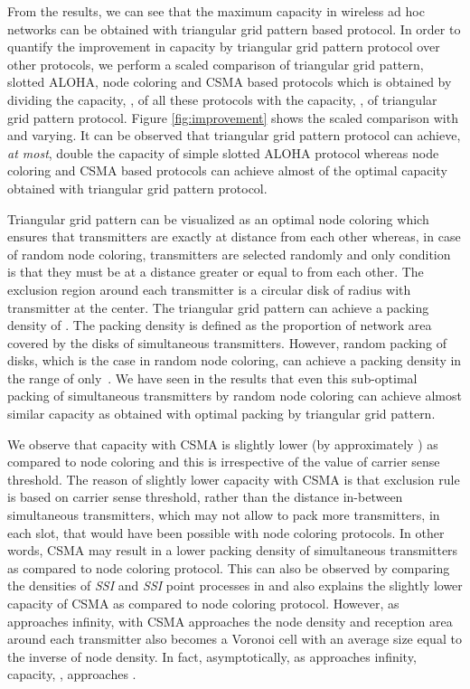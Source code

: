 \documentclass[12pt,english]{article}
\begin{document}
From the results, we can see that the maximum capacity in wireless ad hoc networks can be obtained with triangular grid pattern based protocol. In order to quantify the improvement in capacity by triangular grid pattern protocol over other protocols, we perform a scaled comparison of triangular grid pattern, slotted ALOHA, node coloring and CSMA based protocols which is obtained by dividing the capacity, , of all these protocols with the capacity, , of triangular grid pattern protocol. Figure \ref{fig:improvement} shows the scaled comparison with  and  varying. It can be observed that triangular grid pattern protocol can achieve, {\it at most}, double the capacity of simple slotted ALOHA protocol whereas node coloring and CSMA based protocols can achieve almost \mbox{} of the optimal capacity obtained with triangular grid pattern protocol. 

Triangular grid pattern can be visualized as an optimal node coloring which ensures that transmitters are exactly at distance  from each other whereas, in case of random node coloring, transmitters are selected randomly and only condition is that they must be at a distance greater or equal to  from each other. The exclusion region around each transmitter is a circular disk of radius  with transmitter at the center. The triangular grid pattern can achieve a packing density of \mbox{}. The packing density is defined as the proportion of network area covered by the disks of simultaneous transmitters. However, random packing of disks, which is the case in random node coloring, can achieve a packing density in the range of \mbox{} only~\cite{disk,Busson}. We have seen in the results that even this sub-optimal packing of simultaneous transmitters by random node coloring can achieve almost similar capacity as obtained with optimal packing by triangular grid pattern. 

We observe that capacity with CSMA is slightly lower (by approximately ) as compared to node coloring and this is irrespective of the value of carrier sense threshold. The reason of slightly lower capacity with CSMA is that exclusion rule is based on carrier sense threshold, rather than the distance in-between simultaneous transmitters, which may not allow to pack more transmitters, in each slot, that would have been possible with node coloring protocols. In other words, CSMA may result in a lower packing density of simultaneous transmitters as compared to node coloring protocol. This can also be observed by comparing the densities of {\em SSI} and {\em SSI} point processes in \cite{Busson} and also explains the slightly lower capacity of CSMA as compared to node coloring protocol. However, as  approaches infinity,  with CSMA approaches the node density and reception area around each transmitter also becomes a Voronoi cell with an average size equal to the inverse of node density. In fact, asymptotically, as  approaches infinity, capacity, , approaches .
\end{document}
